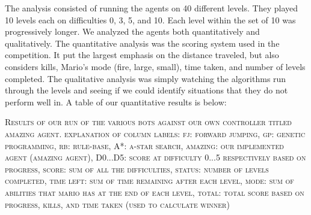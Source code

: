 \documentclass[12pt]{article}
\begin{document}
\begin{multicols}{2}
The analysis consisted of running the agents on 40 different levels.  They played 10 levels each 
on difficulties 0, 3, 5, and 10.  Each level within the set of 10 was progressively longer.  We analyzed 
the agents both quantitatively and qualitatively.  The quantitative analysis was the scoring system 
used in the competition.  It put the largest emphasis on the distance traveled, but also considers 
kills, Mario's mode (fire, large, small), time taken, and number of levels completed.  The qualitative 
analysis was simply watching the algorithms run through the levels and seeing if we could identify 
situations that they do not perform well in.  A table of our quantitative results is below:
\end{multicols}

\begin{center}
\begin{table}[h]
\caption*{\footnotesize Controller Scores}
\end{table}

\vspace{-3ex}
\textsc{\scriptsize Results of our run of the various bots against our own controller titled amazing agent. explanation 
of column labels: fj: forward jumping, gp: genetic programming, rb: rule-base, A*: a-star search, amazing: our 
implemented agent (amazing agent), D0...D5: score at difficulty 0...5 respectively based on progress, score: sum of 
all the difficulties, status: number of levels completed, time left: sum of time remaining after each level, mode: sum of 
abilities that mario has at the end of each level, total: total score based on progress, kills, and time taken (used to 
calculate winner)}
\end{center}
\end{document}
